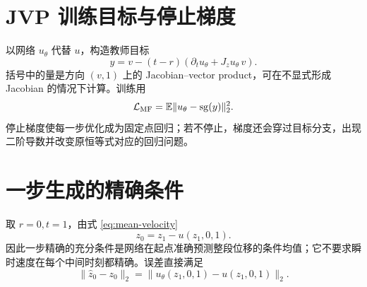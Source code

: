 \documentclass[11pt]{article}
\numberwithin{equation}{section}
\newcommand{\E}{\mathbb{E}}
\newcommand{\1}{\mathbf{1}}
\newcommand{\cL}{\mathcal{L}}
\newcommand{\sg}{\operatorname{sg}}
\begin{document}
\section{JVP 训练目标与停止梯度}
以网络 $u_\theta$ 代替 $u$，构造教师目标
\begin{equation}
  y=v-(t-r)\left(\partial_tu_\theta+J_zu_\theta\,v\right).
\end{equation}
括号中的量是方向 $(v,1)$ 上的 Jacobian--vector product，可在不显式形成 Jacobian 的情况下计算。训练用
\begin{equation}
  \cL_{\rm MF}=\E\|u_\theta-\sg(y)\|_2^2.
\end{equation}
停止梯度使每一步优化成为固定点回归；若不停止，梯度还会穿过目标分支，出现二阶导数并改变原恒等式对应的回归问题。

\section{一步生成的精确条件}
取 $r=0,t=1$，由式 \eqref{eq:mean-velocity}
\begin{equation}
  z_0=z_1-u(z_1,0,1).
\end{equation}
因此一步精确的充分条件是网络在起点准确预测整段位移的条件均值；它不要求瞬时速度在每个中间时刻都精确。误差直接满足
\begin{equation}
  \|\hat z_0-z_0\|_2=\|u_\theta(z_1,0,1)-u(z_1,0,1)\|_2.
\end{equation}
\end{document}
